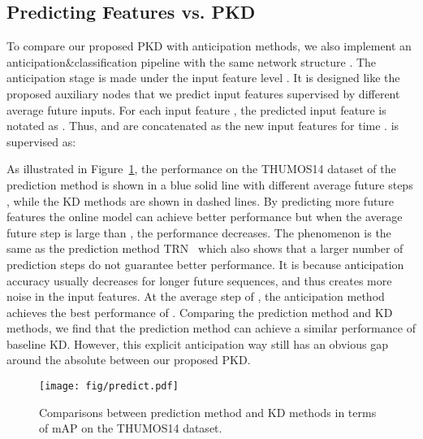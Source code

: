 \documentclass[final]{cvpr}
\begin{document}
\subsection{Predicting Features vs. PKD}

To compare our proposed PKD with anticipation methods, we also implement an anticipation\&classification pipeline with the same network structure . The anticipation stage is made under the input feature level . It is designed like the proposed auxiliary nodes that we predict input features supervised by different average future inputs. For each input feature , the predicted input feature is notated as . Thus,  and  are concatenated as the new input features for time .   is supervised as:



As illustrated in Figure~\ref{fig:predict}, the performance on the THUMOS14 dataset of the prediction method is shown in a blue solid line with different average future steps , while the KD methods are shown in dashed lines. By predicting more future features the online model can achieve better performance but when the average future step is large than , the performance decreases. The phenomenon is the same as the prediction method TRN~\cite{xu2019trn} which also shows that a larger number of prediction steps do not guarantee better performance. It is because anticipation accuracy usually decreases for longer future sequences, and thus creates more noise in the input features. At the average step of , the anticipation method achieves the best performance of . Comparing the prediction method and KD methods, we find that the prediction method can achieve a similar performance of baseline KD. However, this explicit anticipation way still has an obvious gap around the absolute  between our proposed PKD.

\begin{figure}[t]
\begin{center}
  \texttt{[image: fig/predict.pdf]}
\end{center}
\caption{Comparisons between prediction method and KD methods in terms of mAP on the THUMOS14 dataset.
}
\label{fig:predict}
\end{figure}
\end{document}

